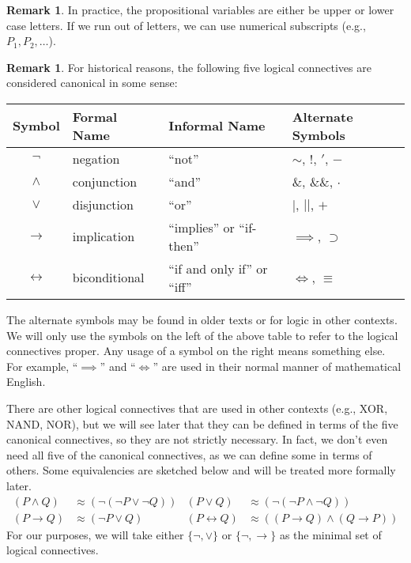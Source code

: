 \documentclass[12pt]{article}
\theoremstyle{definition}
\newtheorem{remark}[theorem]{Remark}
\newcommand{\<}{\langle}
\renewcommand{\>}{\rangle}
\newcommand{\liff}{\leftrightarrow}
\begin{document}
\begin{remark}
    In practice, the propositional variables are either be upper or lower case letters.
    If we run out of letters, we can use numerical subscripts (e.g., $P_1, P_2, \dots$).
\end{remark}

\begin{remark}
    For historical reasons, the following five logical connectives are considered canonical in some sense:
    \begin{center}
        \begin{tabular}{clll}
            \toprule
            \textbf{Symbol} & \textbf{Formal Name} & \textbf{Informal Name} & \textbf{Alternate Symbols}\\
            \midrule
            $\lnot$ & negation & ``not'' & $\sim$, $!$, $'$, $-$ \\ 
            $\land$ & conjunction & ``and'' & $\&$, $\&\&$, $\cdot$ \\ 
            $\lor$ & disjunction & ``or'' & $|$, $||$, $+$ \\ 
            $\to$ & implication & ``implies'' or ``if-then'' & $\implies$, $\supset$ \\
            $\liff$ & biconditional & ``if and only if'' or ``iff'' & $\iff$, $\equiv$ \\
            \bottomrule
        \end{tabular}
    \end{center}
    The alternate symbols may be found in older texts or for logic in other contexts.
    We will only use the symbols on the left of the above table to refer to the logical connectives proper.
    Any usage of a symbol on the right means something else.
    For example, ``$\implies$'' and ``$\iff$'' are used in their normal manner of mathematical English.

    There are other logical connectives that are used in other contexts (e.g., XOR, NAND, NOR), but we will see later that they can be defined in terms of the five canonical connectives, so they are not strictly necessary.
    In fact, we don't even need all five of the canonical connectives, as we can define some in terms of others.
    Some equivalencies are sketched below and will be treated more formally later.
    \begin{align*}
        (P \land Q) &\approx (\lnot(\lnot P \lor \lnot Q))
            & (P \lor Q) &\approx (\lnot(\lnot P \land \lnot Q)) \\
        (P \to Q) &\approx (\lnot P \lor Q)
            & (P \liff Q) &\approx ((P \to Q) \land (Q \to P))
    \end{align*}
    For our purposes, we will take either $\{\lnot, \lor\}$ or $\{\lnot, \to\}$ as the minimal set of logical connectives.
\end{remark}
\end{document}
